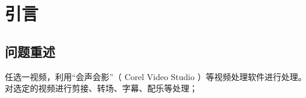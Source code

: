 \documentclass[../main]{subfiles}
\begin{document}
\chapter{引言}%
\label{cha:introduction}

\section{问题重述}%
\label{sec:problem}

\begin{Exercise}
  任选一视频，利用“会声会影”（ Corel Video Studio ）等视频处理软件进行处理。
  对选定的视频进行剪接、转场、字幕、配乐等处理；\cite{larson2010introduction}
\end{Exercise}
\end{document}

